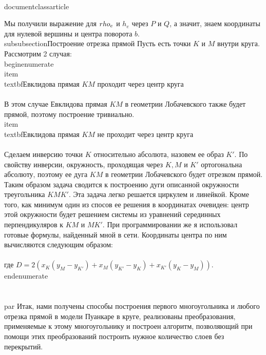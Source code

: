 \\documentclass{article}
\begin{document}
Мы получили выражение для $\\rho_e$ и $h_e$ через $P$ и $Q$, а значит, знаем координаты для нулевой вершины и центра поворота $b$.
\\subsubsection{Построение отрезка прямой}
Пусть есть точки $K$ и $M$ внутри круга. Рассмотрим 2 случая:
\\begin{enumerate}
    \\item \\textbf{Евклидова прямая $KM$ проходит через центр круга} \\\\
    В этом случае Евклидова прямая $KM$ в геометрии Лобачевского также будет прямой, поэтому построение тривиально.
    \\item \\textbf{Евклидова прямая $KM$ не проходит через центр круга} \\\\
    Сделаем инверсию точки $K$ относительно абсолюта, назовем ее образ $K'$. По свойству инверсии, окружность, проходящая через $K, M$ и $K'$ ортогональна абсолюту, поэтому ее дуга $KM$ в геометрии Лобачевского будет отрезком прямой. Таким образом задача сводится к построению дуги описанной окружности треугольника $KMK'$. Эта задача легко решается циркулем и линейкой. Кроме того, как минимум один из спосов ее решения в координатах очевиден: центр этой окружности будет решением системы из уравнений серединных перпендикуляров к $KM$ и $MK'$. При программировании же я использовал готовые формулы, найденный мной в сети. Координаты центра по ним вычисляются следующим образом:
    \\[x_c = \\frac{1}{D}((x_K^2 + y_K^2)(y_M - y_{K'}) + (x_M^2 + y_M^2)(y_{K'} - y_{K}) + (x_{K'}^2 + y_{K'}^2)(y_K - y_{M})),\\]
    \\[ y_c = \\frac{1}{D}((x_K^2 + y_K^2)(x_M - x_{K'}) + (x_M^2 + y_M^2)(x_{K'} - x_{K}) + (x_{K'}^2 + y_{K'}^2)(x_K - x_{M})),\\]
    где $D = 2(x_{K}(y_M - y_{K'}) + x_M(y_{K'} - y_K) + x_{K'}(y_{K} - y_{M}))$.
\\end{enumerate}
\\\\
\\par Итак, нами получены способы построения первого многоугольника и любого отрезка прямой в модели Пуанкаре в круге, реализованы преобразования, применяемые к этому многоугольнику и построен алгоритм, позволяющий при помощи этих преобразований построить нужное количество слоев без перекрытий.
\end{document}
